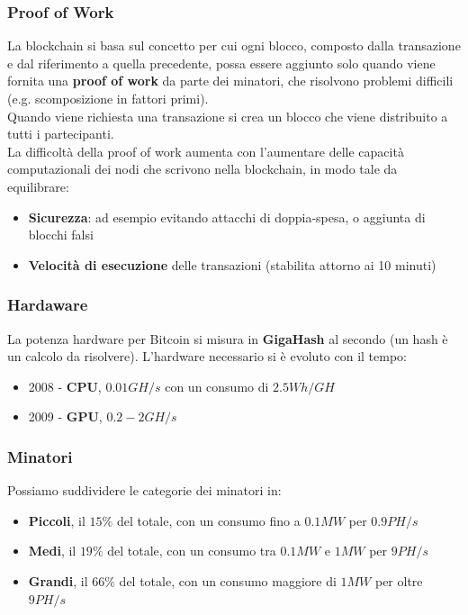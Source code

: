 \subsubsection{Proof of Work}
La blockchain si basa sul concetto per cui ogni blocco, composto dalla transazione e dal riferimento a quella precedente, possa essere aggiunto solo quando viene fornita una \textbf{proof of work} da parte dei minatori, che risolvono problemi difficili (e.g. scomposizione in fattori primi).\\
Quando viene richiesta una transazione si crea un blocco che viene distribuito a tutti i partecipanti.\\
La difficoltà della proof of work aumenta con l'aumentare delle capacità computazionali dei nodi che scrivono nella blockchain, in modo tale da equilibrare:
\begin{itemize}
	\item \textbf{Sicurezza}: ad esempio evitando attacchi di doppia-spesa, o aggiunta di blocchi falsi 
	\item \textbf{Velocità di esecuzione} delle transazioni (stabilita attorno ai 10 minuti)
\end{itemize}

\subsubsection{Hardaware}
La potenza hardware per Bitcoin si misura in \textbf{GigaHash} al secondo (un hash è un calcolo da risolvere). L'hardware necessario si è evoluto con il tempo:
\begin{itemize}
	\item 2008 - \textbf{CPU}, $0.01GH/s$ con un consumo di $2.5Wh/GH$
	\item 2009 - \textbf{GPU}, $0.2-2GH/s$
\end{itemize}

\subsubsection{Minatori}
Possiamo suddividere le categorie dei minatori in:
\begin{itemize}
	\item \textbf{Piccoli}, il $15\%$ del totale, con un consumo fino a $0.1MW$ per $0.9PH/s$
	\item \textbf{Medi}, il $19\%$ del totale, con un consumo tra $0.1MW$ e $1MW$ per $9PH/s$
	\item \textbf{Grandi}, il $66\%$ del totale, con un consumo maggiore di $1MW$ per oltre $9PH/s$
\end{itemize}

